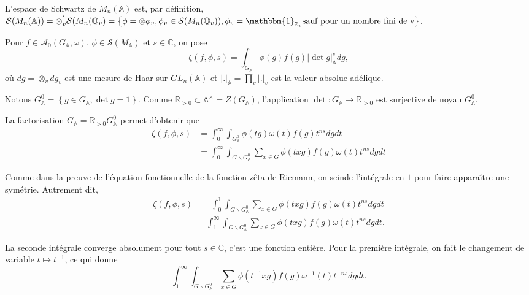 L'espace de Schwartz de $M_n(\mathbb{A})$ est, par définition, $\mathcal{S}(M_n(\mathbb{A}))=\otimes_v^{'} \mathcal{S}(M_n(\mathbb{Q}_v)=\left\lbrace \phi = \otimes \phi_v, \phi_v \in \mathcal{S}(M_n(\mathbb{Q}_v)), \phi_v = \mathbbm{1}_{\mathbb{Z}_v} \text{sauf pour un nombre fini de v} \right\rbrace$.

Pour $f \in \mathcal{A}_0(G_\mathbb{A}, \omega)$, $\phi \in \mathcal{S}(M_\mathbb{A})$ et $s \in \mathbb{C}$, on pose
\begin{equation}
\zeta(f, \phi, s) = \int_{G_\mathbb{A}} \phi(g) f(g) |\det g|_\mathbb{A}^s dg,
\end{equation}
où $dg = \otimes_v dg_v$ est une mesure de Haar sur $GL_n(\mathbb{A})$ et $|.|_\mathbb{A} = \prod_v |.|_v$ est la valeur absolue adélique.

Notons $G^0_\mathbb{A}=\left\lbrace g \in G_\mathbb{A}, \det g = 1 \right\rbrace$. Comme $\mathbb{R}_{> 0} \subset \mathbb{A}^\times=Z(G_\mathbb{A})$, l'application $\det : G_\mathbb{A} \rightarrow \mathbb{R}_{> 0}$ est surjective de noyau $G^0_\mathbb{A}$.

La factorisation $G_\mathbb{A} = \mathbb{R}_{> 0}G^0_\mathbb{A}$ permet d'obtenir que
\begin{align}
\zeta(f, \phi, s) &= \int_0^\infty \int_{G^0_\mathbb{A}} \phi(tg) \omega(t) f(g) t^{ns} dg dt \\
&= \int_0^\infty \int_{G \backslash G^0_\mathbb{A}} \sum_{x \in G}{\phi(txg)} f(g) \omega(t) t^{ns} dg dt
\end{align}

Comme dans la preuve de l'équation fonctionnelle de la fonction zêta de Riemann, on scinde l'intégrale en $1$ pour faire apparaître une symétrie. Autrement dit,
\begin{equation}
\begin{split}
\zeta(f, \phi, s) &= \int_0^1 \int_{G \backslash G^0_\mathbb{A}} \sum_{x \in G}{\phi(txg)} f(g) \omega(t) t^{ns} dg dt \\
&+ \int_1^\infty \int_{G \backslash G^0_\mathbb{A}} \sum_{x \in G}{\phi(txg)} f(g) \omega(t) t^{ns} dg dt.
\end{split}
\end{equation}

La seconde intégrale converge absolument pour tout $s \in \mathbb{C}$, c'est une fonction entière. Pour la première intégrale, on fait le changement de variable $t \mapsto t^{-1}$, ce qui donne
\begin{equation}
\int_1^\infty \int_{G \backslash G^0_\mathbb{A}} \sum_{x \in G}{\phi(t^{-1}xg)} f(g) \omega^{-1}(t) t^{-ns} dg dt.
\end{equation}

